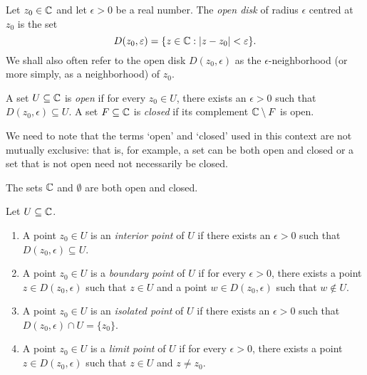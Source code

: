 \begin{definition}
    Let \(z_0 \in \mathbb{C}\) and let \(\epsilon > 0\) be a real number. The \emph{open disk} of radius \(\epsilon\) centred at \(z_0\) is the set
    \[
        D(z_0, \varepsilon) = \{z \in \mathbb{C} : |z - z_0| < \varepsilon\}.
    \]
    We shall also often refer to the open disk \(D(z_0, \epsilon)\) as the \(\epsilon\)-neighborhood (or more simply, as a neighborhood) of \(z_0\).
    \label{def:open-disk}
\end{definition}

\begin{definition}
    A set \(U \subseteq \mathbb{C}\) is \emph{open} if for every \(z_0 \in U\), there exists an \(\epsilon > 0\) such that \(D(z_0, \epsilon) \subseteq U\). A set \(F \subseteq \mathbb{C}\) is \emph{closed} if its complement \(\mathbb{C} \setminus F\) is open.
    \label{def:open-closed-sets}
\end{definition}

We need to note that the terms `open' and `closed' used in this context are not mutually exclusive: that is, for example, a set can be both open and closed or a set that is not open need not necessarily be closed.

\begin{example}
    The sets \(\mathbb{C}\) and \(\emptyset\) are both open and closed.
\end{example}


\begin{definition}%
    Let \(U \subseteq \mathbb{C}\).
    \begin{enumerate}[label=(\alph*)]
        \item A point \(z_0 \in U\) is an \emph{interior point} of \(U\) if there exists an \(\epsilon > 0\) such that \(D(z_0, \epsilon) \subseteq U\).
        \item A point \(z_0 \in U\) is a \emph{boundary point} of \(U\) if for every \(\epsilon > 0\), there exists a point \(z \in D(z_0, \epsilon)\) such that \(z \in U\) and a point \(w \in D(z_0, \epsilon)\) such that \(w \notin U\).
        \item A point \(z_0 \in U\) is an \emph{isolated point} of \(U\) if there exists an \(\epsilon > 0\) such that \(D(z_0, \epsilon) \cap U = \{z_0\}\).
        \item A point \(z_0 \in U\) is a \emph{limit point} of \(U\) if for every \(\epsilon > 0\), there exists a point \(z \in D(z_0, \epsilon)\) such that \(z \in U\) and \(z \neq z_0\).
    \end{enumerate}
    \label{def:taxonomy-points}
\end{definition}


